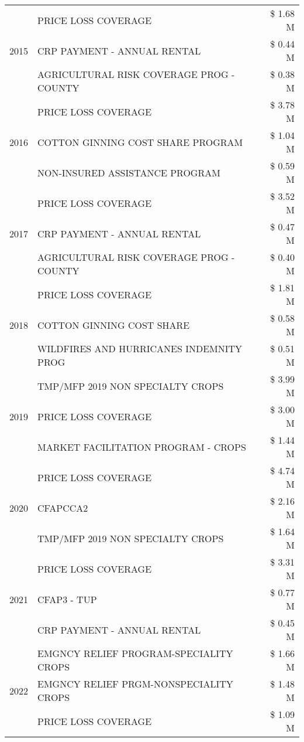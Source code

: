\begin{tabular}{llr}
\cline{1-3}
\multirow[t]{3}{*}{2015} & PRICE LOSS COVERAGE & \$ 1.68 M \\
 & CRP PAYMENT - ANNUAL RENTAL & \$ 0.44 M \\
 & AGRICULTURAL RISK COVERAGE PROG - COUNTY & \$ 0.38 M \\
\cline{1-3}
\multirow[t]{3}{*}{2016} & PRICE LOSS COVERAGE & \$ 3.78 M \\
 & COTTON GINNING COST SHARE PROGRAM & \$ 1.04 M \\
 & NON-INSURED ASSISTANCE PROGRAM & \$ 0.59 M \\
\cline{1-3}
\multirow[t]{3}{*}{2017} & PRICE LOSS COVERAGE & \$ 3.52 M \\
 & CRP PAYMENT - ANNUAL RENTAL & \$ 0.47 M \\
 & AGRICULTURAL RISK COVERAGE PROG - COUNTY & \$ 0.40 M \\
\cline{1-3}
\multirow[t]{3}{*}{2018} & PRICE LOSS COVERAGE & \$ 1.81 M \\
 & COTTON GINNING COST SHARE & \$ 0.58 M \\
 & WILDFIRES AND HURRICANES INDEMNITY PROG & \$ 0.51 M \\
\cline{1-3}
\multirow[t]{3}{*}{2019} & TMP/MFP 2019 NON SPECIALTY CROPS & \$ 3.99 M \\
 & PRICE LOSS COVERAGE & \$ 3.00 M \\
 & MARKET FACILITATION PROGRAM - CROPS & \$ 1.44 M \\
\cline{1-3}
\multirow[t]{3}{*}{2020} & PRICE LOSS COVERAGE & \$ 4.74 M \\
 & CFAPCCA2 & \$ 2.16 M \\
 & TMP/MFP 2019 NON SPECIALTY CROPS & \$ 1.64 M \\
\cline{1-3}
\multirow[t]{3}{*}{2021} & PRICE LOSS COVERAGE & \$ 3.31 M \\
 & CFAP3 - TUP & \$ 0.77 M \\
 & CRP PAYMENT - ANNUAL RENTAL & \$ 0.45 M \\
\cline{1-3}
\multirow[t]{3}{*}{2022} & EMGNCY RELIEF PROGRAM-SPECIALITY CROPS & \$ 1.66 M \\
 & EMGNCY RELIEF PRGM-NONSPECIALITY CROPS & \$ 1.48 M \\
 & PRICE LOSS COVERAGE & \$ 1.09 M \\
\cline{1-3}
\bottomrule
\end{tabular}
